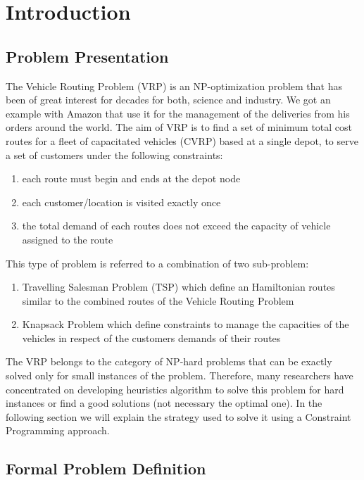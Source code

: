 \chapter{Introduction}
\section{Problem Presentation}
The Vehicle Routing Problem (VRP) is an NP-optimization problem that has been of great interest for decades for both, science and industry. We got an example with Amazon that use it for the management of the deliveries from his orders around the world. The aim of VRP is to find a set of minimum total cost routes for a fleet of capacitated vehicles (CVRP) based at a single depot, to serve a set of customers under the following constraints:
\begin{enumerate}
    \item each route must begin and ends at the depot node
    \item each customer/location is visited exactly once
    \item the total demand of each routes does not exceed the capacity of vehicle assigned to the route
\end{enumerate}
This type of problem is referred to a combination of two sub-problem:
\begin{enumerate}
    \item Travelling Salesman Problem (TSP) which define an Hamiltonian routes similar to the combined routes of the Vehicle Routing Problem
    \item Knapsack Problem which define constraints to manage the capacities of the vehicles in respect of the customers demands of their routes
\end{enumerate}
The VRP belongs to the category of NP-hard problems that can be exactly solved only for small instances of the problem. Therefore, many researchers have concentrated on developing heuristics algorithm to solve this problem for hard instances or find a good solutions (not necessary the optimal one). In the following section we will explain the strategy used to solve it using a Constraint Programming approach.
\newpage
\section{Formal Problem Definition}

